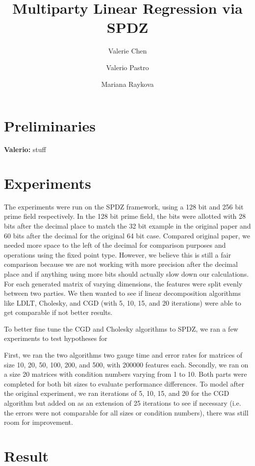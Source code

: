 \documentclass{article}
\title{Multiparty Linear Regression via SPDZ}
\author{Valerie Chen \and Valerio Pastro \and Mariana Raykova}
\theoremstyle{plain}
\theoremstyle{definition}
\theoremstyle{remark}
\newcommand{\vp}[1]{{\textcolor{dblue}{\textbf{Valerio:} #1}}}
\begin{document}
\titlepage
\maketitle

\pagebreak

\section{Preliminaries}
\vp{stuff}

\section{Experiments}
The experiments were run on the SPDZ framework, using a 128 bit and 256 bit prime field respectively. In the 128 bit prime field, the bits were allotted with 28 bits after the decimal place to match the 32 bit example in the original paper and 60 bits after the decimal for the original 64 bit case. Compared original paper, we needed more space to the left of the decimal for comparison purposes and operations using the fixed point type. However, we believe this is still a fair comparison because we are not working with more precision after the decimal place and if anything using more bits should actually slow down our calculations. For each generated matrix of varying dimensions, the features were split evenly between two parties. We then wanted to see if linear decomposition algorithms like LDLT, Cholesky, and CGD (with 5, 10, 15, and 20 iterations) were able to get comparable if not better results. 

To better fine tune the CGD and Cholesky algorithms to SPDZ, we ran a few experiments to test hypotheses for 

First, we ran the two algorithms two gauge time and error rates for matrices of size 10, 20, 50, 100, 200, and 500, with 200000 features each. Secondly, we ran on a size 20 matrices with condition numbers varying from 1 to 10. Both parts were completed for both bit sizes to evaluate performance differences. To model after the original experiment, we ran iterations of 5, 10, 15, and 20 for the CGD algorithm but added on as an extension of 25 iterations to see if necessary (i.e. the errors were not comparable for all sizes or condition numbers), there was still room for improvement. 

\section{Result}
\end{document}
